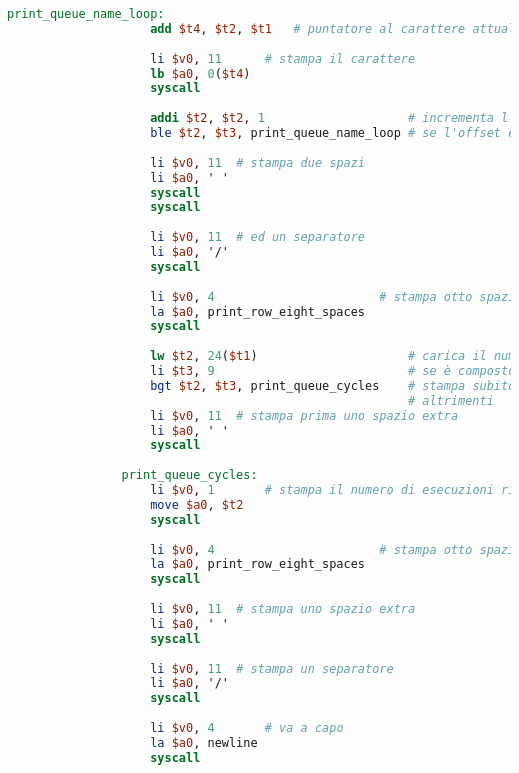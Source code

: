 \begin{center}
\begin{lstlisting}[language=mips, gobble=14, stepnumber=1]
                print_queue_name_loop:
                    add $t4, $t2, $t1   # puntatore al carattere attuale (indirizzo base $t1 + offset attuale $t2)
                    
                    li $v0, 11      # stampa il carattere
                    lb $a0, 0($t4)
                    syscall
                    
                    addi $t2, $t2, 1                    # incrementa l'offset
                    ble $t2, $t3, print_queue_name_loop # se l'offset è minore o uguale dell'offset massimo, esegue un altro ciclo
                    
                    li $v0, 11  # stampa due spazi
                    li $a0, ' '
                    syscall
                    syscall
                    
                    li $v0, 11  # ed un separatore
                    li $a0, '/'
                    syscall
                    
                    li $v0, 4                       # stampa otto spazi
                    la $a0, print_row_eight_spaces
                    syscall
                    
                    lw $t2, 24($t1)                     # carica il numero di cicli rimanenti
                    li $t3, 9                           # se è composto da due cifre
                    bgt $t2, $t3, print_queue_cycles    # stampa subito il numero di cicli
                                                        # altrimenti
                    li $v0, 11  # stampa prima uno spazio extra
                    li $a0, ' '
                    syscall
                    
                print_queue_cycles:
                    li $v0, 1       # stampa il numero di esecuzioni rimanenti
                    move $a0, $t2
                    syscall
                    
                    li $v0, 4                       # stampa otto spazi
                    la $a0, print_row_eight_spaces
                    syscall
                    
                    li $v0, 11  # stampa uno spazio extra
                    li $a0, ' '
                    syscall
                    
                    li $v0, 11  # stampa un separatore
                    li $a0, '/'
                    syscall
                    
                    li $v0, 4       # va a capo
                    la $a0, newline
                    syscall
                    

\end{lstlisting}
\end{center}
